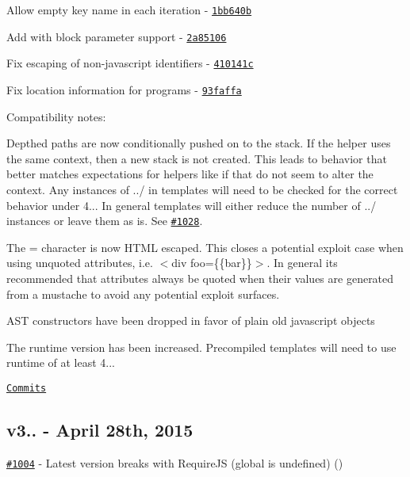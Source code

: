 \begin{DoxyItemize}
\item Allow empty key name in each iteration -\/ \href{https://github.com/wycats/handlebars.js/commit/1bb640b}{\tt 1bb640b}
\item Add with block parameter support -\/ \href{https://github.com/wycats/handlebars.js/commit/2a85106}{\tt 2a85106}
\item Fix escaping of non-\/javascript identifiers -\/ \href{https://github.com/wycats/handlebars.js/commit/410141c}{\tt 410141c}
\item Fix location information for programs -\/ \href{https://github.com/wycats/handlebars.js/commit/93faffa}{\tt 93faffa}
\end{DoxyItemize}

Compatibility notes\+:
\begin{DoxyItemize}
\item Depthed paths are now conditionally pushed on to the stack. If the helper uses the same context, then a new stack is not created. This leads to behavior that better matches expectations for helpers like {\ttfamily if} that do not seem to alter the context. Any instances of {\ttfamily ../} in templates will need to be checked for the correct behavior under 4... In general templates will either reduce the number of {\ttfamily ../} instances or leave them as is. See \href{https://github.com/wycats/handlebars.js/issues/1028}{\tt \#1028}.
\item The {\ttfamily =} character is now H\+T\+ML escaped. This closes a potential exploit case when using unquoted attributes, i.\+e. {\ttfamily $<$div foo=\{\{bar\}\}$>$}. In general it\textquotesingle{}s recommended that attributes always be quoted when their values are generated from a mustache to avoid any potential exploit surfaces.
\item A\+ST constructors have been dropped in favor of plain old javascript objects
\item The runtime version has been increased. Precompiled templates will need to use runtime of at least 4...
\end{DoxyItemize}

\href{https://github.com/wycats/handlebars.js/compare/v3.0.3...v4.0.0}{\tt Commits}

\subsection*{v3.. -\/ April 28th, 2015}


\begin{DoxyItemize}
\item \href{https://github.com/wycats/handlebars.js/issues/1004}{\tt \#1004} -\/ Latest version breaks with Require\+JS (global is undefined) (\href{https://api.github.com/users/boskee}{\tt })
\end{DoxyItemize}

